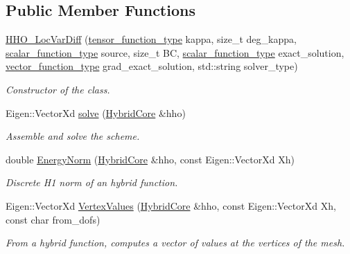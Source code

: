 \subsection*{Public Member Functions}
\begin{DoxyCompactItemize}
\item 
\hyperlink{group__HHO__LocVarDiff_ga57daa01081647a684101ea854b4336b4}{H\+H\+O\+\_\+\+Loc\+Var\+Diff} (\hyperlink{classHArDCore2D_1_1HHO__LocVarDiff_a65b5cbf39a759b6ce3b097536f32f5cb}{tensor\+\_\+function\+\_\+type} kappa, size\+\_\+t deg\+\_\+kappa, \hyperlink{classHArDCore2D_1_1HHO__LocVarDiff_a8b00c073fd089f8c5a642f8dab63f2a3}{scalar\+\_\+function\+\_\+type} source, size\+\_\+t BC, \hyperlink{classHArDCore2D_1_1HHO__LocVarDiff_a8b00c073fd089f8c5a642f8dab63f2a3}{scalar\+\_\+function\+\_\+type} exact\+\_\+solution, \hyperlink{classHArDCore2D_1_1HHO__LocVarDiff_a9951a7b7866719b71956c455f1e3d937}{vector\+\_\+function\+\_\+type} grad\+\_\+exact\+\_\+solution, std\+::string solver\+\_\+type)
\begin{DoxyCompactList}\small\item\em Constructor of the class. \end{DoxyCompactList}\item 
Eigen\+::\+Vector\+Xd \hyperlink{group__HHO__LocVarDiff_ga74eac0904256440c429fb9502112a867}{solve} (\hyperlink{classHArDCore2D_1_1HybridCore}{Hybrid\+Core} \&hho)
\begin{DoxyCompactList}\small\item\em Assemble and solve the scheme. \end{DoxyCompactList}\item 
double \hyperlink{group__HHO__LocVarDiff_gaf359d2047dc5b2fb8640a01c025fb860}{Energy\+Norm} (\hyperlink{classHArDCore2D_1_1HybridCore}{Hybrid\+Core} \&hho, const Eigen\+::\+Vector\+Xd Xh)
\begin{DoxyCompactList}\small\item\em Discrete H1 norm of an hybrid function. \end{DoxyCompactList}\item 
Eigen\+::\+Vector\+Xd \hyperlink{group__HHO__LocVarDiff_gade5fe2edbaf0120b9b5794e96c30e568}{Vertex\+Values} (\hyperlink{classHArDCore2D_1_1HybridCore}{Hybrid\+Core} \&hho, const Eigen\+::\+Vector\+Xd Xh, const char from\+\_\+dofs)
\begin{DoxyCompactList}\small\item\em From a hybrid function, computes a vector of values at the vertices of the mesh. \end{DoxyCompactList}\item 

\end{DoxyCompactItemize}
